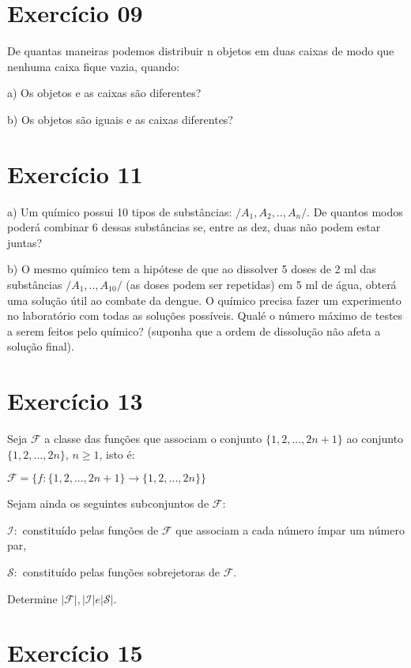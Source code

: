 \documentclass[12pt]{article}
\begin{document}
\section*{Exercício 09}

De quantas maneiras podemos distribuir n objetos em duas caixas de modo que nenhuma caixa fique vazia, quando:

a) Os objetos e as caixas são diferentes?

b) Os objetos são iguais e as caixas diferentes?

\section*{Exercício 11}

a) Um químico possui 10 tipos de substâncias: $/{A_1, A_2, .., A_n/}$. De quantos modos poderá combinar 6 dessas substâncias se, entre as dez, duas não podem estar juntas?

b) O mesmo químico tem a hipótese de que ao dissolver 5 doses de 2 ml das substâncias $/{A_1, .., A_10/}$ (as doses podem ser repetidas) em 5 ml de água, obterá uma solução útil ao combate da dengue. O químico precisa fazer um experimento no laboratório com todas as soluções possíveis. Qualé o número máximo de testes a serem feitos pelo químico? (suponha que a ordem de dissolução não afeta a solução final).

\section*{Exercício 13}

Seja $\mathcal{F}$ a classe das funções que associam o conjunto $\{1, 2, ..., 2n+1\}$ ao conjunto $\{1,2, ... , 2n\}$, $n \geq 1$, isto é:

$\mathcal{F} = \{ f: \{1, 2, ...,2n+1 \} \rightarrow \{1, 2, ..., 2n \} \}$

Sejam ainda os seguintes subconjuntos de $\mathcal{F}$:

$\mathcal{I}:$ constituído pelas funções de $\mathcal{F}$ que associam a cada número ímpar um número par,

$\mathcal{S}:$ constituído pelas funções sobrejetoras de $\mathcal{F}$.

Determine $|\mathcal{F}|, |\mathcal{I}| e |\mathcal{S}|$.

\section*{Exercício 15}
\end{document}
